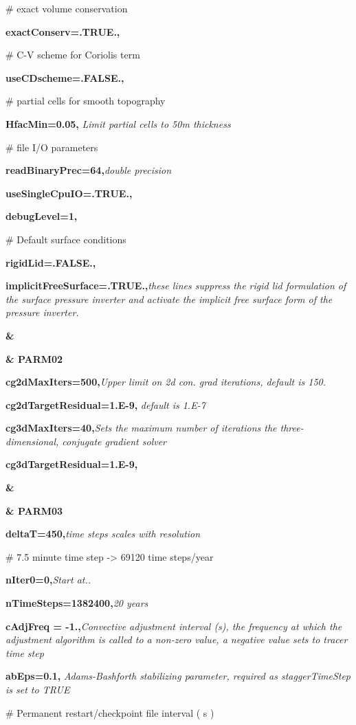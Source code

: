 {\# exact volume conservation

\textbf{exactConserv=.TRUE.,}

\# C-V scheme for Coriolis term

\textbf{useCDscheme=.FALSE.,}

\# partial cells for smooth topography

\textbf{HfacMin=0.05,} \textit{ Limit partial cells to 50m thickness}

\# file I/O parameters

\textbf{readBinaryPrec=64,}\textit{double precision} 

\textbf{ useSingleCpuIO=.TRUE.,}

\textbf{ debugLevel=1,}

\# Default surface conditions

\textbf{rigidLid=.FALSE.,}

\textbf{implicitFreeSurface=.TRUE.,}\textit{these lines suppress the rigid lid formulation of the surface pressure inverter and activate the implicit
free surface form of the pressure inverter.}

\textbf{\&}

\textbf{\& PARM02}

\textbf{cg2dMaxIters=500,}\textit{Upper limit on 2d con. grad iterations, default is 150.}

\textbf{cg2dTargetResidual=1.E-9,} \textit{default is 1.E-7}

\textbf{cg3dMaxIters=40,}\textit{Sets the maximum number of iterations the three-dimensional, conjugate gradient solver}

\textbf{cg3dTargetResidual=1.E-9,}


\textbf{\&}


\textbf{\& PARM03}

\textbf{deltaT=450,}\textit{time steps scales with resolution}

\# 7.5 minute time step -> 69120 time steps/year

\textbf{nIter0=0,}\textit{Start at..}

\textbf{nTimeSteps=1382400,}\textit{20 years}

\textbf{cAdjFreq = -1.,}\textit{Convective adjustment interval (s), the frequency at which the adjustment algorithm is called to a non-zero value, a negative value sets to tracer time step}

\textbf{abEps=0.1,}\textit{ Adams-Bashforth stabilizing parameter, required as staggerTimeStep is set to TRUE}

\# Permanent restart/checkpoint file interval ( s )

}
